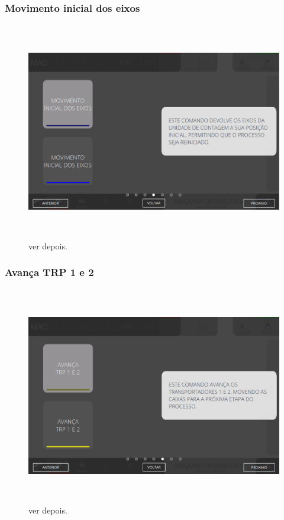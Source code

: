 \newpage
\thispagestyle{fancy}
\vspace*{\fill}
\subsubsection{\small{Movimento inicial dos eixos}}
\begin{figure}[h]
  \centering
  \includegraphics[width=576px,height=360px]{src/imagesFlexo/08-count/commands/e-4.png}
  \caption{ver depois.}
   \label{}
\end{figure}
\vspace*{\fill}

\newpage
\thispagestyle{fancy}
\vspace*{\fill}
\subsubsection{\small{Avança TRP 1 e 2}}
\begin{figure}[h]
  \centering
  \includegraphics[width=576px,height=360px]{src/imagesFlexo/08-count/commands/e-5.png}
  \caption{ver depois.}
   \label{}
\end{figure}
\vspace*{\fill}


